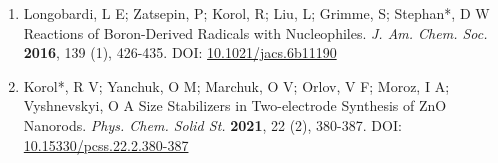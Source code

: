 \begin{enumerate}
\vspace{0.1cm}
\item[2.] Longobardi, L E; Zatsepin, P; Korol, R; Liu, L; Grimme, S; Stephan*, D W Reactions of Boron-Derived Radicals with Nucleophiles. \textit{J. Am. Chem. Soc.} \textbf{2016}, 139 (1), 426-435. DOI: \href{https://doi.org/10.1021/jacs.6b11190}{10.1021/jacs.6b11190}
\vspace{0.1cm}
\item[1.] Korol*, R V; Yanchuk, O M; Marchuk, O V; Orlov, V F; Moroz, I A; Vyshnevskyi, O A Size Stabilizers in Two-electrode Synthesis of ZnO Nanorods. \textit{Phys. Chem. Solid St.} \textbf{2021}, 22 (2), 380-387. DOI: \href{https://doi.org/10.15330/pcss.22.2.380-387}{10.15330/pcss.22.2.380-387}
\vspace{0.1cm}
\end{enumerate}
